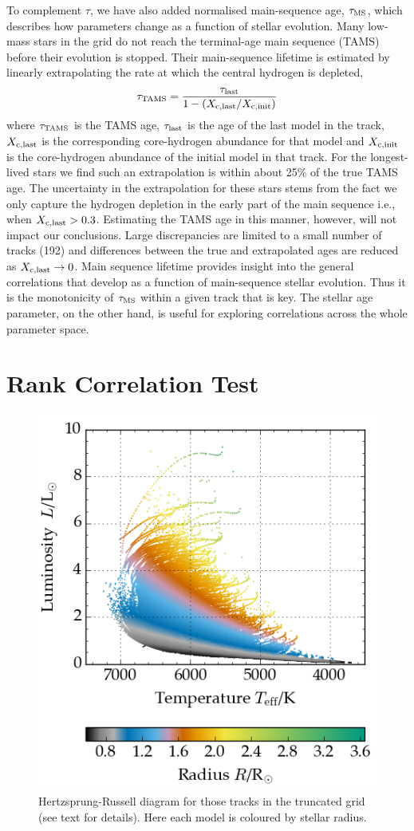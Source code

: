 To complement $\tau$, we have also added normalised main-sequence age, $\tau_{\rm{MS}}$, which describes how parameters change as a function of stellar evolution. 
Many low-mass stars in the grid do not reach the terminal-age main sequence (TAMS) before their evolution is stopped. 
Their main-sequence lifetime is estimated by linearly extrapolating the rate at which the central hydrogen is depleted,
\begin{equation}
\tau_{\rm{TAMS}} =  \frac{\tau_{\rm{last}}}{1-(X_{\rm{c, last}}/X_{\rm{c, init}})}
\end{equation}
where $\tau_{\rm{TAMS}}$ is the TAMS age,  $\tau_{\rm{last}}$ is the age of the last model in  the track,  $X_{\rm{c, last}}$ is the corresponding core-hydrogen abundance for that model and $X_{\rm{c, init}}$ is the core-hydrogen abundance of the initial model in that track. 
For the longest-lived stars we find such an extrapolation is within about 25\% of the true TAMS age. The uncertainty in the extrapolation for these stars stems from the fact we only capture the hydrogen depletion in the early part of the main sequence i.e., when  $X_{\rm{c, last}} > 0.3$.  Estimating the TAMS age in this manner, however,  will not impact our conclusions.
Large discrepancies are limited to a small number of tracks (192) and differences between the true and extrapolated ages are reduced as $X_{\rm{c, last}} \to 0$. 
Main sequence lifetime  provides insight into the general correlations that develop as a function of main-sequence stellar evolution. Thus it is the monotonicity of $\tau_{\rm{MS}}$ within a given track that is key.  The stellar age parameter, on the other hand, is useful for exploring correlations across the whole parameter space. 


\section{Rank Correlation Test}
\label{sec:RCT}


\begin{figure}
    \centering
    \includegraphics[width=0.6\linewidth]{HRD6.png}
    \caption[Hertzsprung-Russell diagram for the grid of models]{Hertzsprung-Russell diagram for those tracks in the truncated grid (see text for details). Here each model is coloured by stellar radius.}
    \label{fig:HRDRad}
\end{figure}



